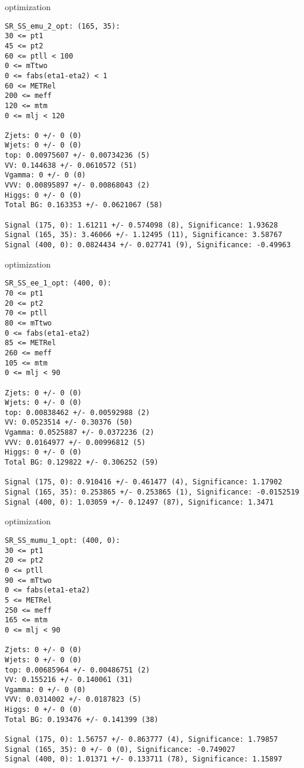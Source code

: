\begin{frame}[fragile]{optimization}
\tiny
\begin{verbatim}
SR_SS_emu_2_opt: (165, 35):
30 <= pt1
45 <= pt2
60 <= ptll < 100
0 <= mTtwo
0 <= fabs(eta1-eta2) < 1
60 <= METRel
200 <= meff
120 <= mtm
0 <= mlj < 120

Zjets: 0 +/- 0 (0)
Wjets: 0 +/- 0 (0)
top: 0.00975607 +/- 0.00734236 (5)
VV: 0.144638 +/- 0.0610572 (51)
Vgamma: 0 +/- 0 (0)
VVV: 0.00895897 +/- 0.00868043 (2)
Higgs: 0 +/- 0 (0)
Total BG: 0.163353 +/- 0.0621067 (58)

Signal (175, 0): 1.61211 +/- 0.574098 (8), Significance: 1.93628
Signal (165, 35): 3.46066 +/- 1.12495 (11), Significance: 3.58767
Signal (400, 0): 0.0824434 +/- 0.027741 (9), Significance: -0.49963

\end{verbatim}
\end{frame}

\begin{frame}[fragile]{optimization}
\tiny
\begin{verbatim}
SR_SS_ee_1_opt: (400, 0):
70 <= pt1
20 <= pt2
70 <= ptll
80 <= mTtwo
0 <= fabs(eta1-eta2)
85 <= METRel
260 <= meff
105 <= mtm
0 <= mlj < 90

Zjets: 0 +/- 0 (0)
Wjets: 0 +/- 0 (0)
top: 0.00838462 +/- 0.00592988 (2)
VV: 0.0523514 +/- 0.30376 (50)
Vgamma: 0.0525887 +/- 0.0372236 (2)
VVV: 0.0164977 +/- 0.00996812 (5)
Higgs: 0 +/- 0 (0)
Total BG: 0.129822 +/- 0.306252 (59)

Signal (175, 0): 0.910416 +/- 0.461477 (4), Significance: 1.17902
Signal (165, 35): 0.253865 +/- 0.253865 (1), Significance: -0.0152519
Signal (400, 0): 1.03059 +/- 0.12497 (87), Significance: 1.3471
\end{verbatim}
\end{frame}

\begin{frame}[fragile]{optimization}
\tiny
\begin{verbatim}
SR_SS_mumu_1_opt: (400, 0):
30 <= pt1
20 <= pt2
0 <= ptll
90 <= mTtwo
0 <= fabs(eta1-eta2)
5 <= METRel
250 <= meff
165 <= mtm
0 <= mlj < 90

Zjets: 0 +/- 0 (0)
Wjets: 0 +/- 0 (0)
top: 0.00685964 +/- 0.00486751 (2)
VV: 0.155216 +/- 0.140061 (31)
Vgamma: 0 +/- 0 (0)
VVV: 0.0314002 +/- 0.0187823 (5)
Higgs: 0 +/- 0 (0)
Total BG: 0.193476 +/- 0.141399 (38)

Signal (175, 0): 1.56757 +/- 0.863777 (4), Significance: 1.79857
Signal (165, 35): 0 +/- 0 (0), Significance: -0.749027
Signal (400, 0): 1.01371 +/- 0.133711 (78), Significance: 1.15897
\end{verbatim}
\end{frame}

